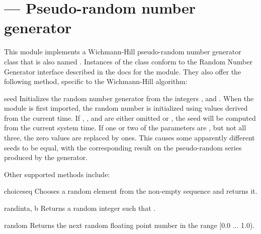 \section{ ---
         Pseudo-random number generator}




This module implements a Wichmann-Hill pseudo-random number generator
class that is also named .  Instances of the
 class conform to the Random Number Generator
interface described in the docs for the  module.
They also offer the 
following method, specific to the Wichmann-Hill algorithm:

\begin{methoddesc}[whrandom]{seed}{}
  Initializes the random number generator from the integers ,
   and .  When the module is first imported, the random
  number is initialized using values derived from the current time.
  If , , and  are either omitted or , the 
  seed will be computed from the current system time.  If one or two
  of the parameters are , but not all three, the zero values
  are replaced by ones.  This causes some apparently different seeds
  to be equal, with the corresponding result on the pseudo-random
  series produced by the generator.
\end{methoddesc}

Other supported methods include:

\begin{funcdesc}{choice}{seq}
Chooses a random element from the non-empty sequence  and returns it.
\end{funcdesc}

\begin{funcdesc}{randint}{a, b}
Returns a random integer  such that .
\end{funcdesc}

\begin{funcdesc}{random}{}
Returns the next random floating point number in the range [0.0 ... 1.0).
\end{funcdesc}

